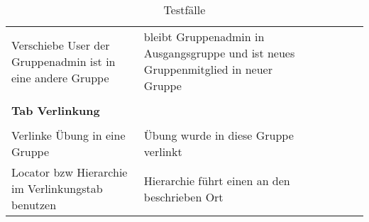 \begin{table}[]
	\centering
	\caption{Testfälle}
	\label{my-label}
	\begin{tabular}{p{6cm}p{7cm}p{3cm}llll}Verschiebe User der Gruppenadmin ist in eine andere Gruppe                                                                           & bleibt Gruppenadmin in Ausgangsgruppe und ist neues Gruppenmitglied in neuer Gruppe                                                                              & \checkmark          &  &  &  \\
		&                                                                                                                                                                  &             &  &  &  \\
		\textbf{	Tab Verlinkung  }                                                                                                                     &                                                                                                                                                                  &             &  &  &  \\
			&                                                                                                                                                                  &             &  &  &  \\
		Verlinke Übung in eine Gruppe                                                                                                        & Übung wurde in diese Gruppe verlinkt                                                                                                                             & \checkmark           &  &  &  \\
		Locator bzw Hierarchie im Verlinkungstab benutzen                                                                                    & Hierarchie führt einen an den beschrieben Ort                                                                                                                    & \checkmark           &  &  &  \\
		

\end{tabular}
\end{table}
